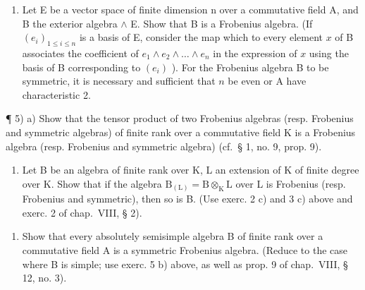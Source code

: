 \begin{enumerate}
\def\labelenumi{\alph{enumi})}
\setcounter{enumi}{1}
\tightlist
\item
  Let E be a vector space of finite dimension n over a commutative field A, and B the exterior algebra \(\wedge\) E. Show that B is a Frobenius algebra. (If \((e_i)_{1 \leqslant i \leqslant n}\) is a basis of E, consider the map which to every element \(x\) of B associates the coefficient of \(e_1 \wedge e_2 \wedge \ldots \wedge e_n\) in the expression of \(x\) using the basis of B corresponding to \((e_i)\) ). For the Frobenius algebra B to be symmetric, it is necessary and sufficient that \(n\) be even or A have characteristic 2.
\end{enumerate}

¶ 5) a) Show that the tensor product of two Frobenius algebras (resp. Frobenius and symmetric algebras) of finite rank over a commutative field K is a Frobenius algebra (resp. Frobenius and symmetric algebra) (cf.~§ 1, no. 9, prop. 9).

\begin{enumerate}
\def\labelenumi{\alph{enumi})}
\setcounter{enumi}{1}
\tightlist
\item
  Let B be an algebra of finite rank over K, L an extension of K of finite degree over K. Show that if the algebra \(\mathrm{B}_{(\mathrm{L})} = \mathrm{B} \otimes_{\mathrm{K}} \mathrm{L}\) over L is Frobenius (resp. Frobenius and symmetric), then so is B. (Use exerc. 2 c) and 3 c) above and exerc. 2 of chap.~VIII, § 2).
\end{enumerate}

\begin{enumerate}
\def\labelenumi{\arabic{enumi})}
\setcounter{enumi}{5}
\tightlist
\item
  Show that every absolutely semisimple algebra B of finite rank over a commutative field A is a symmetric Frobenius algebra. (Reduce to the case where B is simple; use exerc. 5 b) above, as well as prop. 9 of chap.~VIII, § 12, no. 3).
\end{enumerate}

